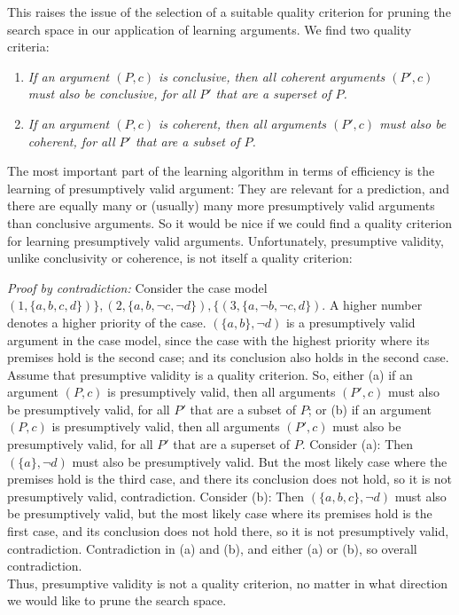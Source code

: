 This raises the issue of the selection of a suitable quality criterion for pruning the search space in our application of learning arguments. We find two quality criteria: 

\begin{enumerate}
    \item \textit{If an argument $(P, c)$ is conclusive, then all coherent arguments $(P', c)$ must also be conclusive, for all $P'$ that are a superset of $P$.} 
    \item \textit{If an argument $(P, c)$ is coherent, then all arguments $(P', c)$ must also be coherent, for all $P'$ that are a subset of $P$.}
\end{enumerate}

The most important part of the learning algorithm in terms of efficiency is the learning of presumptively valid argument: They are relevant for a prediction, and there are equally many or (usually) many more  presumptively valid arguments than conclusive arguments. So it would be nice if we could find a quality criterion for learning presumptively valid arguments. Unfortunately, presumptive validity, unlike conclusivity or coherence, is not itself a quality criterion: 

\textit{Proof by contradiction:} Consider the case model $ (1, \{a,b,c,d\})\}, (2, \{a, b, \neg c, \neg d\}), \{(3, \{a, \neg b, \neg c, d\})$. A higher number denotes a higher priority of the case. $(\{a, b\}, \neg d)$ is a presumptively valid argument in the case model, since the case with the highest priority where its premises hold is the second case; and its conclusion also holds in the second case. \\
Assume that presumptive validity is a quality criterion. So, either (a) if an argument $(P, c)$ is presumptively valid, then all arguments $(P', c)$ must also be presumptively valid, for all $P'$ that are a subset of $P$; or (b) if an argument $(P, c)$ is presumptively valid, then all arguments $(P', c)$ must also be presumptively valid, for all $P'$ that are a superset of $P$. Consider (a): Then $(\{a\}, \neg d)$ must also be presumptively valid. But the most likely case where the premises hold is the third case, and there its conclusion does not hold, so it is not presumptively valid, contradiction. Consider (b): Then $(\{a, b, c\}, \neg d)$ must also be presumptively valid, but the most likely case where its premises hold is the first case, and its conclusion does not hold there, so it is not presumptively valid, contradiction. Contradiction in (a) and (b), and either (a) or (b), so overall contradiction.\\
Thus, presumptive validity is not a quality criterion, no matter in what direction we would like to prune the search space.\square

